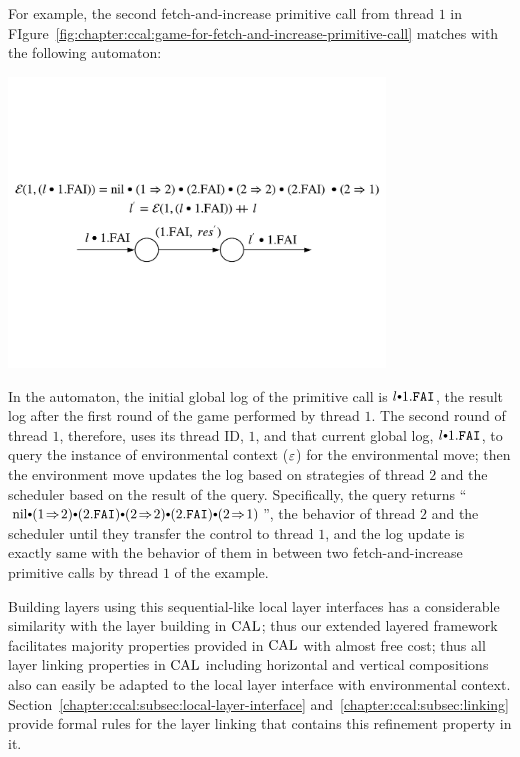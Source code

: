 For example, the second fetch-and-increase primitive call from thread $1$ in FIgure~\ref{fig:chapter:ccal:game-for-fetch-and-increase-primitive-call}
matches with the following automaton:
\begin{center}
\includegraphics[width=0.75\textwidth]{figs/ccal/faiexamplewithcontext}
\end{center}
In the automaton, the initial global log of the primitive call is $l \cons 1.\incticket$,
the result log after the first round of the game performed by thread $1$.
The second round of thread $1$, therefore, uses its thread ID, $1$,  and that current global log, $l \cons 1.\incticket$, to query the instance of environmental context (${\varepsilon}$) for the environmental move; then the environment move updates the log based on strategies of thread $2$ and the scheduler based on the result of the query.
Specifically, the query returns ``$\nulllist \cons (1 \switch 2) \cons (2.\incticket) \cons (2 \switch 2) \cons (2.\incticket) \cons (2 \switch 1)$'',
the behavior of thread $2$ and the scheduler until they transfer the control to thread $1$,  and 
the log update is exactly same with the behavior of them in between two fetch-and-increase primitive calls by thread $1$ of the example.

Building layers using this sequential-like local layer interfaces has a considerable similarity with 
the layer building in $\mathrm{CAL}$; thus 
our extended layered framework facilitates
majority properties provided in $\mathrm{CAL}$ with almost free cost;
thus all layer linking properties in $\mathrm{CAL}$ including horizontal and vertical compositions also can 
easily be adapted to the local layer interface with environmental context.
Section~\ref{chapter:ccal:subsec:local-layer-interface}  and~\ref{chapter:ccal:subsec:linking} provide formal rules for the layer linking that contains this refinement property in it.

